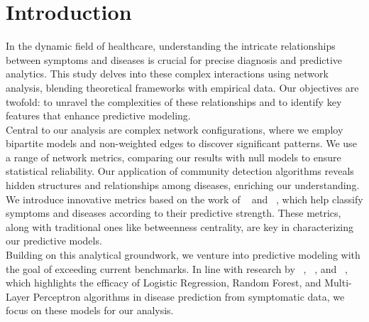 \section{Introduction}

In the dynamic field of healthcare, understanding the intricate relationships between symptoms and diseases is crucial
for precise diagnosis and predictive analytics. This study delves into these complex interactions using network analysis,
blending theoretical frameworks with empirical data. Our objectives are twofold: to unravel the complexities of these
relationships and to identify key features that enhance predictive modeling.\\
Central to our analysis are complex network configurations, where we employ bipartite models and non-weighted edges to discover significant patterns.
We use a range of network metrics, comparing our results with null models to ensure statistical reliability. Our application of community detection
algorithms reveals hidden structures and relationships among diseases, enriching our understanding.\\
We introduce innovative metrics based on the work of \citeauthor{Hidalgo_2009}~\cite{Hidalgo_2009} and \citeauthor{Hidalgo_2007}~\cite{Hidalgo_2007},
which help classify symptoms and diseases according to their predictive strength. These metrics, along with traditional ones like betweenness centrality,
are key in characterizing our predictive models.\\
Building on this analytical groundwork, we venture into predictive modeling with the goal of exceeding current benchmarks.
In line with research by \citeauthor{Kohli}~\cite{Kohli}, \citeauthor{Singh}~\cite{Singh}, and \citeauthor{Uddin2019Dec}~\cite{Uddin2019Dec},
which highlights the efficacy of Logistic Regression, Random Forest, and Multi-Layer Perceptron algorithms in disease prediction from symptomatic data,
we focus on these models for our analysis.